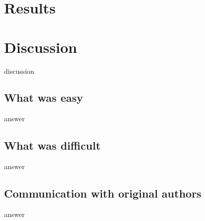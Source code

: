 %
%    



\section{Results}




\section{Discussion}
discussion

\subsection{What was easy}
answer

\subsection{What was difficult}
answer

\subsection{Communication with original authors}
answer
